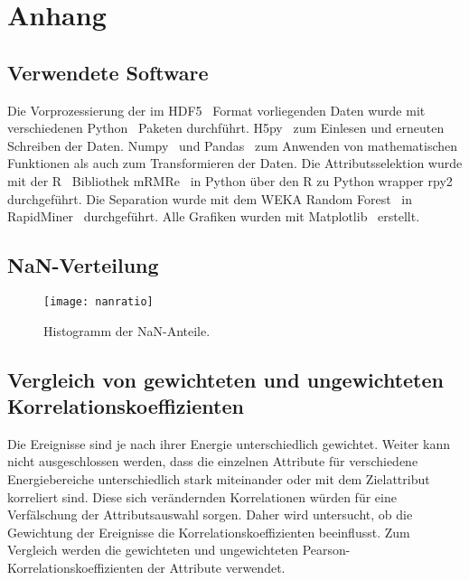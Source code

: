 \chapter{Anhang}


\section{Verwendete Software}
Die Vorprozessierung der im HDF5~\cite{hdf5} Format vorliegenden Daten wurde mit verschiedenen Python~\cite{pythonFirst} Paketen durchführt.
H5py~\cite{h5py} zum Einlesen und erneuten Schreiben der Daten.
Numpy~\cite{numpy} und Pandas~\cite{pandas} zum Anwenden von mathematischen Funktionen als auch zum Transformieren der Daten.
Die Attributsselektion wurde mit der R~\cite{R} Bibliothek mRMRe~\cite{mrmre} in Python über den R zu Python wrapper rpy2~\cite{rpy2} durchgeführt.
Die Separation wurde mit dem WEKA Random Forest~\cite{Weka2009} in RapidMiner~\cite{RapidMiner} durchgeführt. 
Alle Grafiken wurden mit Matplotlib~\cite{matplotlib} erstellt.

\section{NaN-Verteilung}
\label{nanverteilung}

\begin{figure}
\begin{center}
    \texttt{[image: nanratio]}
\end{center}
\vspace{-2em}
    \caption{Histogramm der NaN-Anteile.}
\label{fig:nanverteilung}
\end{figure}

\section{Vergleich von gewichteten und ungewichteten Korrelationskoeffizienten}
\label{korrkoeff}

Die Ereignisse sind je nach ihrer Energie unterschiedlich gewichtet.
Weiter kann nicht ausgeschlossen werden, dass die einzelnen Attribute für verschiedene Energiebereiche unterschiedlich stark miteinander oder mit dem Zielattribut korreliert sind.
Diese sich verändernden Korrelationen würden für eine Verfälschung der Attributsauswahl sorgen.
Daher wird untersucht, ob die Gewichtung der Ereignisse die Korrelationskoeffizienten beeinflusst.
Zum Vergleich werden die gewichteten und ungewichteten Pearson-Korrelationskoeffizienten der Attribute verwendet.

